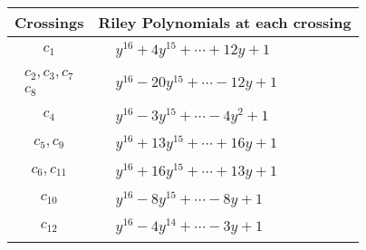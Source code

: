 \documentclass[1p]{elsarticle_modified}
\theoremstyle{definition}
\begin{document}
\begin{tabular}{m{50pt}|m{274pt}}
Crossings & \hspace{64pt}Riley Polynomials at each crossing \\
\hline $$\begin{aligned}c_{1}\end{aligned}$$&$\begin{aligned}
&y^{16}+4 y^{15}+\cdots+12 y+1
\end{aligned}$\\
\hline $$\begin{aligned}c_{2},c_{3},c_{7}\\c_{8}\end{aligned}$$&$\begin{aligned}
&y^{16}-20 y^{15}+\cdots-12 y+1
\end{aligned}$\\
\hline $$\begin{aligned}c_{4}\end{aligned}$$&$\begin{aligned}
&y^{16}-3 y^{15}+\cdots-4 y^2+1
\end{aligned}$\\
\hline $$\begin{aligned}c_{5},c_{9}\end{aligned}$$&$\begin{aligned}
&y^{16}+13 y^{15}+\cdots+16 y+1
\end{aligned}$\\
\hline $$\begin{aligned}c_{6},c_{11}\end{aligned}$$&$\begin{aligned}
&y^{16}+16 y^{15}+\cdots+13 y+1
\end{aligned}$\\
\hline $$\begin{aligned}c_{10}\end{aligned}$$&$\begin{aligned}
&y^{16}-8 y^{15}+\cdots-8 y+1
\end{aligned}$\\
\hline $$\begin{aligned}c_{12}\end{aligned}$$&$\begin{aligned}
&y^{16}-4 y^{14}+\cdots-3 y+1
\end{aligned}$\\
\hline
\end{tabular}\\~\\
\end{document}
